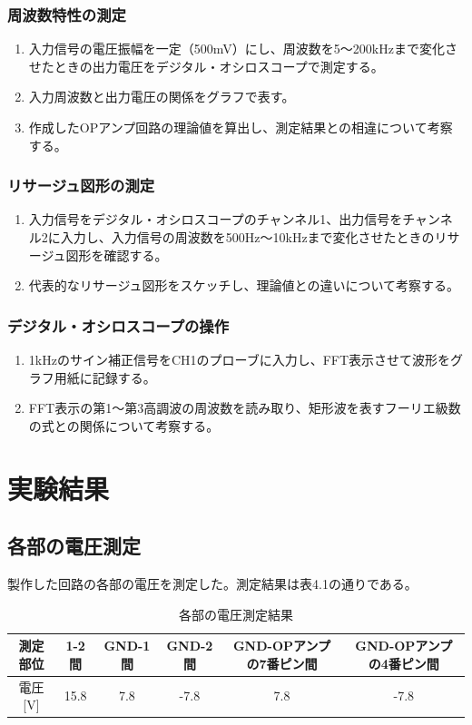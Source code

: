 \documentclass{jlreq}
\numberwithin{equation}{section}
\begin{document}
\subsubsection{周波数特性の測定}
\begin{enumerate}
  \item 入力信号の電圧振幅を一定（500mV）にし、周波数を5～200kHzまで変化させたときの出力電圧をデジタル・オシロスコープで測定する。
  \item 入力周波数と出力電圧の関係をグラフで表す。
  \item 作成したOPアンプ回路の理論値を算出し、測定結果との相違について考察する。
\end{enumerate}

\subsubsection{リサージュ図形の測定}
\begin{enumerate}
  \item 入力信号をデジタル・オシロスコープのチャンネル1、出力信号をチャンネル2に入力し、入力信号の周波数を500Hz～10kHzまで変化させたときのリサージュ図形を確認する。
  \item 代表的なリサージュ図形をスケッチし、理論値との違いについて考察する。
\end{enumerate}

\subsubsection{デジタル・オシロスコープの操作}
\begin{enumerate}
  \item 1kHzのサイン補正信号をCH1のプローブに入力し、FFT表示させて波形をグラフ用紙に記録する。
  \item FFT表示の第1～第3高調波の周波数を読み取り、矩形波を表すフーリエ級数の式との関係について考察する。
\end{enumerate}

\section{実験結果}

\subsection{各部の電圧測定}
製作した回路の各部の電圧を測定した。測定結果は表4.1の通りである。
\begin{table}[H]
  \centering
  \caption{各部の電圧測定結果}
  \begin{tabular}{|c|c|c|c|c|c|}
    \hline
    測定部位 & 1-2間 & GND-1間 & GND-2間 & GND-OPアンプの7番ピン間 & GND-OPアンプの4番ピン間 \\ \hline
    電圧[V] & 15.8 & 7.8 & -7.8 & 7.8 & -7.8\\ \hline
  \end{tabular}
\end{table}
\end{document}
